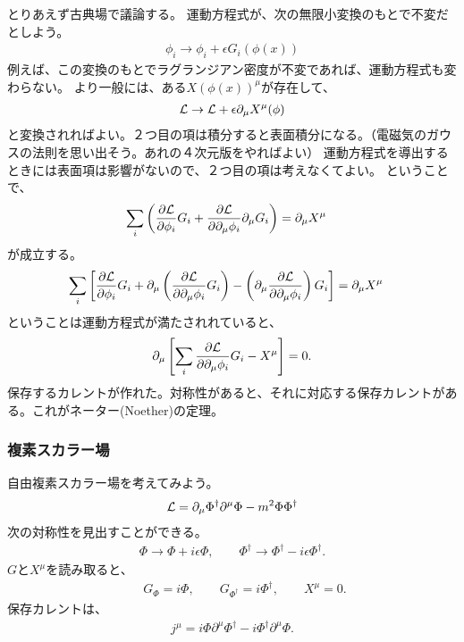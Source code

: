 \documentclass[10pt,a4paper]{jarticle}
\begin{document}
とりあえず古典場で議論する。
運動方程式が、次の無限小変換のもとで不変だとしよう。
\begin{align}
\phi_i \to \phi_i + \epsilon G_i(\phi(x))
\end{align}
%
例えば、この変換のもとでラグランジアン密度が不変であれば、運動方程式も変わらない。
より一般には、ある$X(\phi(x))^\mu$が存在して、
\begin{align}
{\cal L} \to {\cal L} + \epsilon \partial_\mu X^\mu(\phi)
\end{align}
と変換されればよい。２つ目の項は積分すると表面積分になる。（電磁気のガウスの法則を思い出そう。あれの４次元版をやればよい）
運動方程式を導出するときには表面項は影響がないので、２つ目の項は考えなくてよい。
%
ということで、
\begin{align}
\sum_i \left( \frac{\partial {\cal L}}{\partial \phi_i} G_i
+ \frac{\partial {\cal L}}{\partial \partial_\mu \phi_i} \partial_\mu G_i \right) &= \partial_\mu X^\mu
\end{align}
が成立する。
\begin{align}
\sum_i \left[
\frac{\partial {\cal L}}{\partial \phi_i} G_i
+ \partial_\mu \left( \frac{\partial {\cal L}}{\partial \partial_\mu \phi_i} G_i \right)
- \left( \partial_\mu \frac{\partial {\cal L}}{\partial \partial_\mu \phi_i} \right) G_i \right] &= \partial_\mu X^\mu
\end{align}
%
ということは運動方程式が満たされれていると、
\begin{align}
\partial_\mu \left[ \sum_i \frac{\partial {\cal L}}{\partial \partial_\mu \phi_i} G_i - X^\mu \right] = 0.
\end{align}
%
保存するカレントが作れた。対称性があると、それに対応する保存カレントがある。これがネーター(Noether)の定理。

\subsubsection{複素スカラー場}
自由複素スカラー場を考えてみよう。
\begin{align}
{\cal L} = \partial_\mu \Phi^\dagger \partial^\mu \Phi - m^2 \Phi \Phi^\dagger
\end{align}
%
次の対称性を見出すことができる。
\begin{align}
\Phi \to \Phi + i \epsilon \Phi, \qquad \Phi^\dagger \to \Phi^\dagger - i \epsilon \Phi^\dagger.
\end{align}
%
$G$と$X^\mu$を読み取ると、
\begin{align}
\qquad G_\Phi = i \Phi, \qquad G_{\Phi^\dagger} = i\Phi^\dagger, \qquad X^\mu = 0.
\end{align}
%
保存カレントは、
\begin{align}
j^\mu = i\Phi \partial^\mu \Phi^\dagger - i\Phi^\dagger \partial^\mu \Phi.
\end{align}
\end{document}
